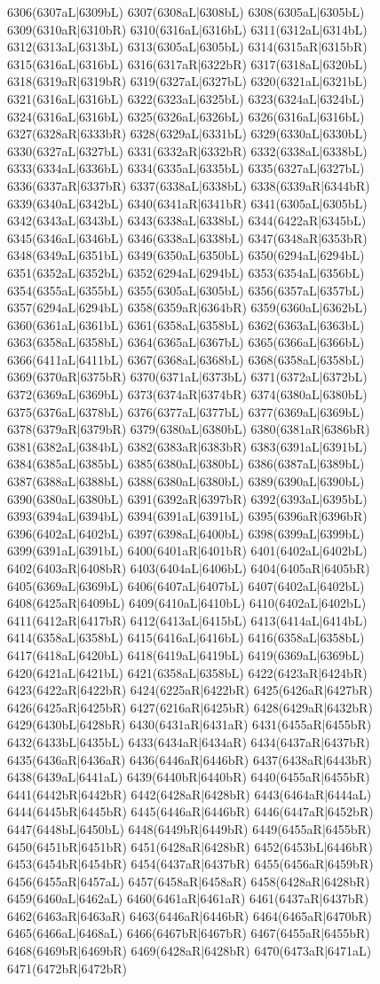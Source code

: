 6306(6307aL|6309bL) 6307(6308aL|6308bL) 6308(6305aL|6305bL) 6309(6310aR|6310bR) 6310(6316aL|6316bL) 6311(6312aL|6314bL) 6312(6313aL|6313bL) 6313(6305aL|6305bL) 6314(6315aR|6315bR) 6315(6316aL|6316bL) 6316(6317aR|6322bR) 6317(6318aL|6320bL) 6318(6319aR|6319bR) 6319(6327aL|6327bL) 6320(6321aL|6321bL) 6321(6316aL|6316bL) 6322(6323aL|6325bL) 6323(6324aL|6324bL) 6324(6316aL|6316bL) 6325(6326aL|6326bL) 6326(6316aL|6316bL) 6327(6328aR|6333bR) 6328(6329aL|6331bL) 6329(6330aL|6330bL) 6330(6327aL|6327bL) 6331(6332aR|6332bR) 6332(6338aL|6338bL) 6333(6334aL|6336bL) 6334(6335aL|6335bL) 6335(6327aL|6327bL) 6336(6337aR|6337bR) 6337(6338aL|6338bL) 6338(6339aR|6344bR) 6339(6340aL|6342bL) 6340(6341aR|6341bR) 6341(6305aL|6305bL) 6342(6343aL|6343bL) 6343(6338aL|6338bL) 6344(6422aR|6345bL) 6345(6346aL|6346bL) 6346(6338aL|6338bL) 6347(6348aR|6353bR) 6348(6349aL|6351bL) 6349(6350aL|6350bL) 6350(6294aL|6294bL) 6351(6352aL|6352bL) 6352(6294aL|6294bL) 6353(6354aL|6356bL) 6354(6355aL|6355bL) 6355(6305aL|6305bL) 6356(6357aL|6357bL) 6357(6294aL|6294bL) 6358(6359aR|6364bR) 6359(6360aL|6362bL) 6360(6361aL|6361bL) 6361(6358aL|6358bL) 6362(6363aL|6363bL) 6363(6358aL|6358bL) 6364(6365aL|6367bL) 6365(6366aL|6366bL) 6366(6411aL|6411bL) 6367(6368aL|6368bL) 6368(6358aL|6358bL) 6369(6370aR|6375bR) 6370(6371aL|6373bL) 6371(6372aL|6372bL) 6372(6369aL|6369bL) 6373(6374aR|6374bR) 6374(6380aL|6380bL) 6375(6376aL|6378bL) 6376(6377aL|6377bL) 6377(6369aL|6369bL) 6378(6379aR|6379bR) 6379(6380aL|6380bL) 6380(6381aR|6386bR) 6381(6382aL|6384bL) 6382(6383aR|6383bR) 6383(6391aL|6391bL) 6384(6385aL|6385bL) 6385(6380aL|6380bL) 6386(6387aL|6389bL) 6387(6388aL|6388bL) 6388(6380aL|6380bL) 6389(6390aL|6390bL) 6390(6380aL|6380bL) 6391(6392aR|6397bR) 6392(6393aL|6395bL) 6393(6394aL|6394bL) 6394(6391aL|6391bL) 6395(6396aR|6396bR) 6396(6402aL|6402bL) 6397(6398aL|6400bL) 6398(6399aL|6399bL) 6399(6391aL|6391bL) 6400(6401aR|6401bR) 6401(6402aL|6402bL) 6402(6403aR|6408bR) 6403(6404aL|6406bL) 6404(6405aR|6405bR) 6405(6369aL|6369bL) 6406(6407aL|6407bL) 6407(6402aL|6402bL) 6408(6425aR|6409bL) 6409(6410aL|6410bL) 6410(6402aL|6402bL) 6411(6412aR|6417bR) 6412(6413aL|6415bL) 6413(6414aL|6414bL) 6414(6358aL|6358bL) 6415(6416aL|6416bL) 6416(6358aL|6358bL) 6417(6418aL|6420bL) 6418(6419aL|6419bL) 6419(6369aL|6369bL) 6420(6421aL|6421bL) 6421(6358aL|6358bL) 6422(6423aR|6424bR) 6423(6422aR|6422bR) 6424(6225aR|6422bR) 6425(6426aR|6427bR) 6426(6425aR|6425bR) 6427(6216aR|6425bR) 6428(6429aR|6432bR) 6429(6430bL|6428bR) 6430(6431aR|6431aR) 6431(6455aR|6455bR) 6432(6433bL|6435bL) 6433(6434aR|6434aR) 6434(6437aR|6437bR) 6435(6436aR|6436aR) 6436(6446aR|6446bR) 6437(6438aR|6443bR) 6438(6439aL|6441aL) 6439(6440bR|6440bR) 6440(6455aR|6455bR) 6441(6442bR|6442bR) 6442(6428aR|6428bR) 6443(6464aR|6444aL) 6444(6445bR|6445bR) 6445(6446aR|6446bR) 6446(6447aR|6452bR) 6447(6448bL|6450bL) 6448(6449bR|6449bR) 6449(6455aR|6455bR) 6450(6451bR|6451bR) 6451(6428aR|6428bR) 6452(6453bL|6446bR) 6453(6454bR|6454bR) 6454(6437aR|6437bR) 6455(6456aR|6459bR) 6456(6455aR|6457aL) 6457(6458aR|6458aR) 6458(6428aR|6428bR) 6459(6460aL|6462aL) 6460(6461aR|6461aR) 6461(6437aR|6437bR) 6462(6463aR|6463aR) 6463(6446aR|6446bR) 6464(6465aR|6470bR) 6465(6466aL|6468aL) 6466(6467bR|6467bR) 6467(6455aR|6455bR) 6468(6469bR|6469bR) 6469(6428aR|6428bR) 6470(6473aR|6471aL) 6471(6472bR|6472bR) 